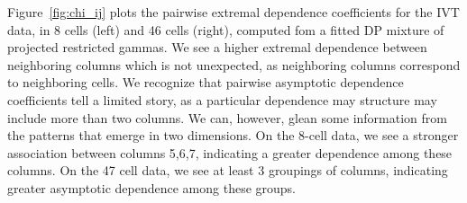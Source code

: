 Figure~\ref{fig:chi_ij} plots the pairwise extremal dependence coefficients for the IVT data, in 8
  cells (left) and 46 cells (right), computed fom a fitted DP mixture of projected restricted gammas.
  We see a higher extremal dependence between neighboring columns which is not unexpected, as
  neighboring columns correspond to neighboring cells.  We recognize that pairwise asymptotic dependence
  coefficients tell a limited story, as a particular dependence may structure may include more than
  two columns.   We can, however, glean some information from the patterns that emerge in two dimensions.
  On the 8-cell data, we see a stronger association between columns 5,6,7, indicating a greater
  dependence among these columns.  On the 47 cell data, we see at least 3 groupings of columns,
  indicating greater asymptotic dependence among these groups.

